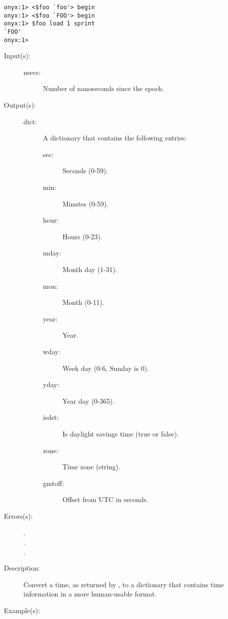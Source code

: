 \begin{description}
\begin{description}
\begin{verbatim}
onyx:1> <$foo `foo'> begin
onyx:1> <$foo `FOO'> begin
onyx:1> $foo load 1 sprint
`FOO'
onyx:1>
		\end{verbatim}
	\end{description}
\label{systemdict:localtime}
\item[{\onyxop{nsecs}{localtime}{dict}}: ]
	\begin{description}\item[]
	\item[Input(s): ]
		\begin{description}\item[]
		\item[nsecs: ]
			Number of nanoseconds since the epoch.
		\end{description}
	\item[Output(s): ]
		\begin{description}\item[]
		\item[dict: ]
			A dictionary that contains the following entries:
			\begin{description}\item[]
			\item[sec: ]
				Seconds (0-59).
			\item[min: ]
				Minutes (0-59).
			\item[hour: ]
				Hours (0-23).
			\item[mday: ]
				Month day (1-31).
			\item[mon: ]
				Month (0-11).
			\item[year: ]
				Year.
			\item[wday: ]
				Week day (0-6, Sunday is 0).
			\item[yday: ]
				Year day (0-365).
			\item[isdst: ]
				Is daylight savings time (true or false).
			\item[zone: ]
				Time zone (string).
			\item[gmtoff: ]
				Offset from UTC in seconds.
			\end{description}
		\end{description}
	\item[Errors(s): ]
		\begin{description}\item[]
		\item[.]
		\item[.]
		\item[.]
		\end{description}
	\item[Description: ]
		Convert a time, as returned by
		, to a dictionary that
		contains time information in a more human-usable format.
	\item[Example(s): ]\begin{verbatim}


\end{verbatim}
\end{description}
\end{description}
